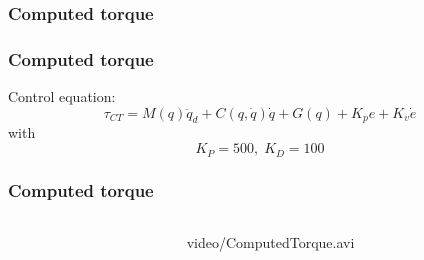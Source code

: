 \subsubsection{Computed torque}
%
\begin{frame}
\frametitle{Computed torque}
Control equation:
\begin{equation}
	\tau_{CT} = M(q)\ddot{q}_d + C(q,\dot{q})\dot{q} + G(q) + K_pe + K_v\dot{e}
\end{equation}
with
\begin{equation*}
K_P = 500, \; K_D = 100
\end{equation*}
\end{frame}
%
\begin{frame}
\frametitle{Computed torque}
%
\begin{columns}
\begin{column}{0.4\textwidth}
\end{column}
\begin{column}{0.6\textwidth}
	\begin{center}
		{video/ComputedTorque.avi}
	\end{center}
\end{column}
\end{columns}
\end{frame}
%
